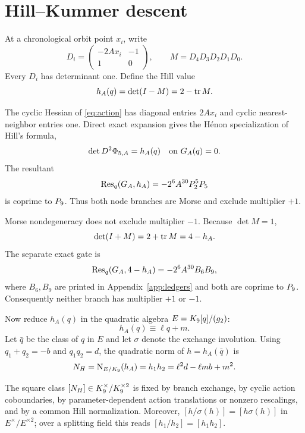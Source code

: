 \section{Hill--Kummer descent}

At a chronological orbit point \(x_i\), write
\begin{equation}
D_i=\begin{pmatrix}-2Ax_i&-1\\1&0\end{pmatrix},
\qquad
M=D_4D_3D_2D_1D_0.                                        \label{eq:monodromy}
\end{equation}
Every \(D_i\) has determinant one.  Define the Hill value
\[
h_A(q)=\det(I-M)=2-\operatorname{tr} M.
\]

The cyclic Hessian of \eqref{eq:action} has diagonal entries \(2Ax_i\) and
cyclic nearest-neighbor entries one.  Direct exact expansion gives the H\'enon
specialization of Hill's formula,
\begin{equation}
\det D^2\Phi_{5,A}=h_A(q)
\quad\text{on }G_A(q)=0.                                  \label{eq:hill}
\end{equation}
The resultant
\begin{equation}
\operatorname{Res}_q(G_A,h_A)=-2^6A^{30}P_2^5P_5                        \label{eq:plus}
\end{equation}
is coprime to \(P_9\).  Thus both node branches are Morse and exclude
multiplier \(+1\).

Morse nondegeneracy does not exclude multiplier \(-1\).  Because \(\det M=1\),
\[
\det(I+M)=2+\operatorname{tr} M=4-h_A.
\]
The separate exact gate is
\begin{equation}
\operatorname{Res}_q(G_A,4-h_A)=-2^6A^{30}B_6B_9,                       \label{eq:minus}
\end{equation}
where \(B_6,B_9\) are printed in Appendix~\ref{app:ledgers} and both are
coprime to \(P_9\).  Consequently neither branch has multiplier \(+1\) or
\(-1\).

Now reduce \(h_A(q)\) in the quadratic algebra
\(E=K_9[q]/(g_2)\):
\[
h_A(q)\equiv\ell q+m.
\]
Let \(\bar q\) be the class of \(q\) in \(E\) and let \(\sigma\) denote
the exchange involution.  Using \(q_1+q_2=-b\) and \(q_1q_2=d\), the
quadratic norm of \(h=h_A(\bar q)\) is
\begin{equation}
N_H=\operatorname{N}_{E/K_9}(h_A)=h_1h_2=\ell^2d-\ell mb+m^2.          \label{eq:NH}
\end{equation}

\begin{lemma}\label{lem:gauge}
The square class \([N_H]\in K_9^\times/K_9^{\times2}\) is fixed by branch
exchange, by cyclic action coboundaries, by parameter-dependent action
translations or nonzero rescalings, and by a common Hill normalization.
Moreover,
\([h/\sigma(h)]=[h\sigma(h)]\) in \(E^\times/E^{\times2}\); over a
splitting field this reads \([h_1/h_2]=[h_1h_2]\).
\end{lemma}

